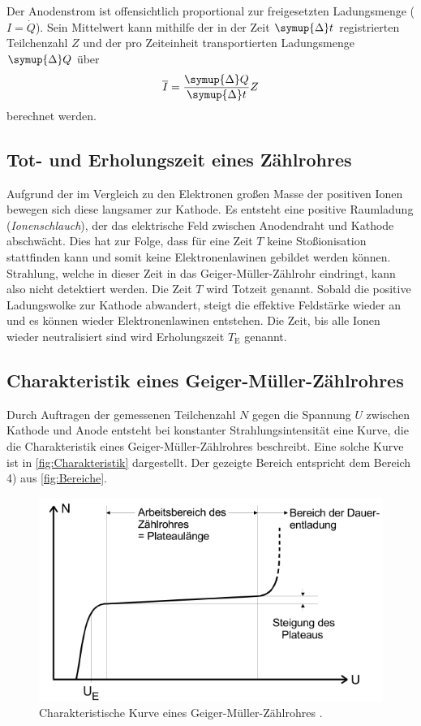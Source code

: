 Der Anodenstrom ist offensichtlich proportional zur freigesetzten Ladungsmenge ($I = \dot{Q}$). Sein Mittelwert kann mithilfe der in der Zeit $\symup{\Delta}t$ registrierten
Teilchenzahl $Z$ und der pro Zeiteinheit transportierten Ladungsmenge $\symup{\Delta}Q$ über 
\begin{equation}
  \label{eqn:Strom}
  \overline{I} = \frac{\symup{\Delta}Q}{\symup{\Delta}t}Z
\end{equation} 
berechnet werden.
\subsection{Tot- und Erholungszeit eines Zählrohres}
\label{subsec:Totzeit}
Aufgrund der im Vergleich zu den Elektronen großen Masse der positiven Ionen bewegen sich diese langsamer zur Kathode. Es entsteht eine positive Raumladung 
(\textit{Ionenschlauch}), der das elektrische Feld zwischen Anodendraht und Kathode abschwächt. Dies hat zur Folge, dass für eine Zeit $T$ keine Stoßionisation
stattfinden kann und somit keine Elektronenlawinen gebildet werden können. Strahlung, welche in dieser Zeit in das Geiger-Müller-Zählrohr eindringt, kann also
nicht detektiert werden. Die Zeit $T$ wird Totzeit genannt. Sobald die positive Ladungswolke zur Kathode abwandert, steigt die effektive Feldstärke wieder an 
und es können wieder Elektronenlawinen entstehen. Die Zeit, bis alle Ionen wieder neutralisiert sind wird Erholungszeit $T_\text{E}$ genannt.

\subsection{Charakteristik eines Geiger-Müller-Zählrohres}
\label{subsec:Charakteristik}
Durch Auftragen der gemessenen Teilchenzahl $N$ gegen die Spannung $U$ zwischen Kathode und Anode entsteht bei konstanter Strahlungsintensität eine Kurve, die
die Charakteristik eines Geiger-Müller-Zählrohres beschreibt. Eine solche Kurve ist in \autoref{fig:Charakteristik} dargestellt. Der gezeigte Bereich entspricht
dem Bereich 4) aus \autoref{fig:Bereiche}.

\begin{figure}
  \centering
  \includegraphics[width = .7\textwidth]{content/Charakteristik.png}
  \caption{Charakteristische Kurve eines Geiger-Müller-Zählrohres \cite{v703}.}
  \label{fig:Charakteristik}
\end{figure}

